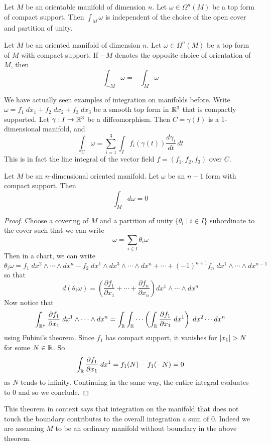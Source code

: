 \documentclass[a4paper]{article}
\begin{document}
\begin{prp}{}{} Let $M$ be an orientable manifold of dimension $n$. Let $\omega\in\Omega^n(M)$ be a top form of compact support. Then $\int_M\omega$ is independent of the choice of the open cover and partition of unity. 
\end{prp}

\begin{prp}{}{} Let $M$ be an oriented manifold of dimension $n$. Let $\omega\in\Omega^n(M)$ be a top form of $M$ with compact support. If $-M$ denotes the opposite choice of orientation of $M$, then $$\int_{-M}\omega=-\int_M\omega$$
\end{prp}

We have actually seen examples of integration on manifolds before. Write $\omega=f_1\;dx_1+f_2\;dx_2+f_3\;dx_3$ be a smooth top form in $\mathbb{R}^3$ that is compactly supported. Let $\gamma:I\to\mathbb{R}^3$ be a diffeomorphism. Then $C=\gamma(I)$ is a $1$-dimensional manifold, and $$\int_C\omega=\sum_{i=1}^3\int_If_i(\gamma(t))\frac{d\gamma_i}{dt}\,dt$$ This is in fact the line integral of the vector field $f=(f_1,f_2,f_3)$ over $C$. 

\begin{thm}{}{} Let $M$ be an $n$-dimensional oriented manifold. Let $\omega$ be an $n-1$ form with compact support. Then $$\int_Md\omega=0$$ \tcbline
\begin{proof}
Choose a covering of $M$ and a partition of unity $\{\theta_i\;|\;i\in I\}$ subordinate to the cover such that we can write $$\omega=\sum_{i\in I}\theta_i\omega$$ Then in a chart, we can write $$\theta_i\omega=f_1\;dx^2\wedge\cdots\wedge dx^n-f_2\;dx^1\wedge dx^3\wedge\cdots\wedge dx^n+\cdots+(-1)^{n+1}f_n\;dx^1\wedge\cdots\wedge dx^{n-1}$$ so that $$d(\theta_i\omega)=\left(\frac{\partial f_1}{\partial x_1}+\cdots+\frac{\partial f_n}{\partial x_n}\right)dx^1\wedge\cdots\wedge dx^n$$ Now notice that $$\int_{\mathbb{R}^n}\frac{\partial f_1}{\partial x_1}\;dx^1\wedge\cdots\wedge dx^n=\int_{\mathbb{R}}\int_{\mathbb{R}}\cdots\left(\int_{\mathbb{R}}\frac{\partial f_1}{\partial x_1}\;dx^1\right)\;dx^2\cdots dx^n$$ using Fubini's theorem. Since $f_1$ has compact support, it vanishes for $\abs{x_1}>N$ for some $N\in\mathbb{R}$. So $$\int_{\mathbb{R}}\frac{\partial f_1}{\partial x_1}\;dx^1=f_1(N)-f_1(-N)=0$$ as $N$ tends to infinity. Continuing in the same way, the entire integral evaluates to $0$ and so we conclude. 
\end{proof}
\end{thm}

This theorem in context says that integration on the manifold that does not touch the boundary contributes to the overall integration a sum of $0$. Indeed we are assuming $M$ to be an ordinary manifold without boundary in the above theorem. 
\end{document}
